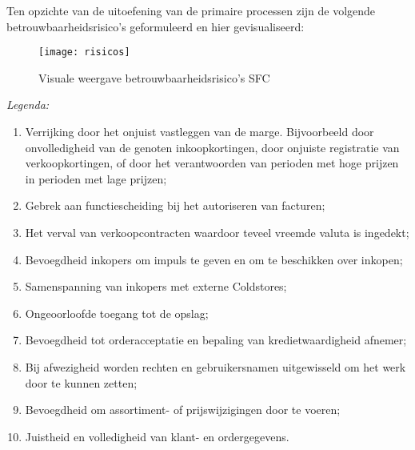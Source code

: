 \newpage
\noindent
Ten opzichte van de uitoefening van de primaire processen zijn de volgende betrouwbaarheidsrisico's geformuleerd en hier gevisualiseerd:

\begin{figure}[h]
    \centering
    \texttt{[image: risicos]}
    \caption{Visuale weergave betrouwbaarheidsrisico's SFC}
    \label{fig:risicos}
\end{figure}

\noindent
\textit{Legenda:}
\begin{enumerate}
    \item Verrijking door het onjuist vastleggen van de marge. Bijvoorbeeld door onvolledigheid van de genoten inkoopkortingen, door onjuiste registratie van verkoopkortingen, of door het verantwoorden van perioden met hoge prijzen in perioden met lage prijzen;
    \item Gebrek aan functiescheiding bij het autoriseren van facturen;
    \item Het verval van verkoopcontracten waardoor teveel vreemde valuta is ingedekt;
    \item Bevoegdheid inkopers om impuls te geven en om te beschikken over inkopen;
    \item Samenspanning van inkopers met externe Coldstores;
    \item Ongeoorloofde toegang tot de opslag;
    \item Bevoegdheid tot orderacceptatie en bepaling van kredietwaardigheid afnemer;
    \item Bij afwezigheid worden rechten en gebruikersnamen uitgewisseld om het werk door te kunnen zetten;
    \item Bevoegdheid om assortiment- of prijswijzigingen door te voeren;
    \item Juistheid en volledigheid van klant- en ordergegevens.
\end{enumerate}




